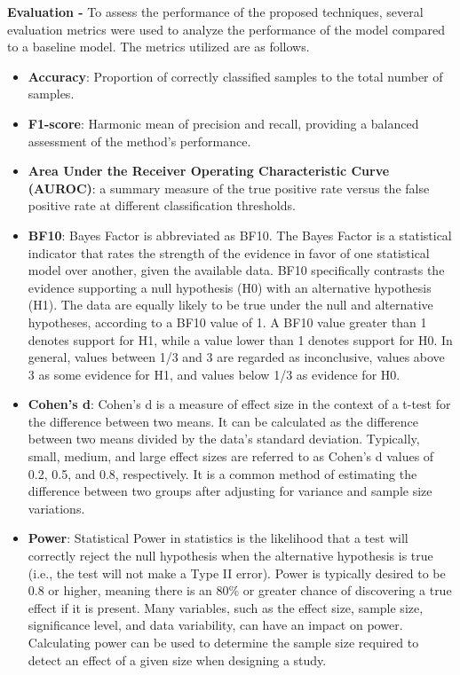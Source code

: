 \textbf{Evaluation - } To assess the performance of the proposed techniques, several evaluation metrics were used to analyze the performance of the model compared to a baseline model. The metrics utilized are as follows.
\begin{itemize}
    \item \textbf{Accuracy}: Proportion of correctly classified samples to the total number of samples.
    \item \textbf{F1-score}: Harmonic mean of precision and recall, providing a balanced assessment of the method's performance.
    \item \textbf{Area Under the Receiver Operating Characteristic Curve (AUROC)}: a summary measure of the true positive rate versus the false positive rate at different classification thresholds.
    \item \textbf{BF10}: Bayes Factor is abbreviated as BF10. The Bayes Factor is a statistical indicator that rates the strength of the evidence in favor of one statistical model over another, given the available data. BF10 specifically contrasts the evidence supporting a null hypothesis (H0) with an alternative hypothesis (H1). The data are equally likely to be true under the null and alternative hypotheses, according to a BF10 value of 1. A BF10 value greater than 1 denotes support for H1, while a value lower than 1 denotes support for H0. In general, values between 1/3 and 3 are regarded as inconclusive, values above 3 as some evidence for H1, and values below 1/3 as evidence for H0.
    \item \textbf{Cohen's d}: Cohen's d is a measure of effect size in the context of a t-test for the difference between two means. It can be calculated as the difference between two means divided by the data's standard deviation. Typically, small, medium, and large effect sizes are referred to as Cohen's d values of 0.2, 0.5, and 0.8, respectively. It is a common method of estimating the difference between two groups after adjusting for variance and sample size variations.
    \item \textbf{Power}: Statistical Power in statistics is the likelihood that a test will correctly reject the null hypothesis when the alternative hypothesis is true (i.e., the test will not make a Type II error). Power is typically desired to be 0.8 or higher, meaning there is an 80\% or greater chance of discovering a true effect if it is present. Many variables, such as the effect size, sample size, significance level, and data variability, can have an impact on power. Calculating power can be used to determine the sample size required to detect an effect of a given size when designing a study.
\end{itemize}


